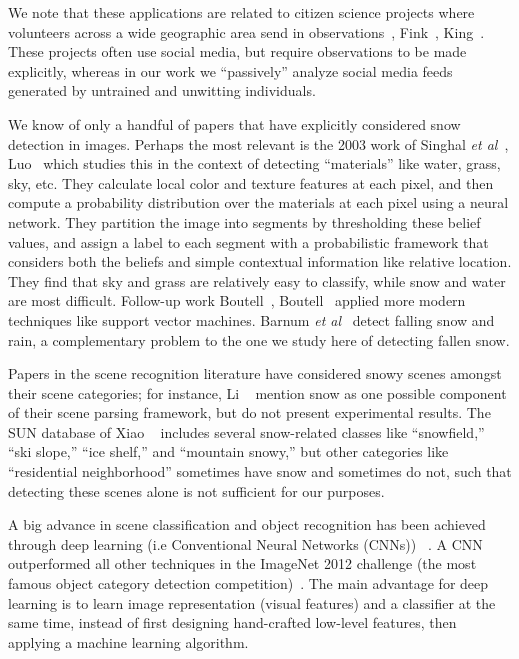 We note that these applications are related to citizen science
projects where volunteers across a wide geographic area send 
in observations~\cite{greatsunflower}, Fink\etal~\cite{ebirds}, King\etal~\cite{king09snowtweets}. These projects
often use social media, but require observations to be made
explicitly, whereas in our work we ``passively'' analyze social
media feeds generated by untrained and unwitting individuals.

 We know of only a handful of
papers that have explicitly considered snow detection in
images. Perhaps the most relevant is the 2003 work of Singhal
\textit{et al}~\cite{singhal2003spatialcontext}, Luo\etal~\cite{luo2003spatialcontext}
which studies this in the context of detecting ``materials'' like
water, grass, sky, etc. They calculate local color and texture
features at each pixel, and then compute a probability
distribution over the materials at each pixel using a neural
network. They partition the image into segments by thresholding these
belief values, and assign a label to each segment with a probabilistic
framework that considers both the beliefs and simple
contextual information like relative location.
They find that sky and grass are relatively easy to classify, while snow and water are
most difficult. Follow-up work Boutell\etal~\cite{boutell2006semanticfeature}, Boutell~\cite{boutell2005exploiting} applied more modern techniques like
support vector machines.  Barnum \textit{et al}~\cite{rain2009IJCV} detect falling snow and rain, a complementary problem to the one we study here of detecting fallen
snow.

 Papers in the scene recognition literature have considered
snowy scenes amongst their scene categories; for instance, Li \etal~\cite{li2009totalscene,li2007event} mention snow as one possible
component of their scene parsing framework, but do not present
experimental results. The SUN database of Xiao \etal~\cite{XiaoHEOT10} includes several snow-related classes like
``snowfield,'' ``ski slope,'' ``ice shelf,'' and ``mountain snowy,''
but other categories like ``residential neighborhood'' sometimes have
snow and sometimes do not, such that detecting these scenes alone
is not sufficient for our purposes. 

A big advance in scene classification and object recognition has been achieved through deep learning (i.e Conventional Neural Networks (CNNs)) ~\cite{krizhevsky2012imagenet,chatfield2011devil,zhou2014learning,grangier2009deep}. A CNN outperformed all other techniques in the ImageNet 2012 challenge (the most famous object category detection competition)~\cite{russakovsky2014imagenet}. The main advantage for deep learning is to learn image representation (visual features) and a classifier at the same time, instead of first designing hand-crafted low-level features, then applying a machine learning algorithm. 







